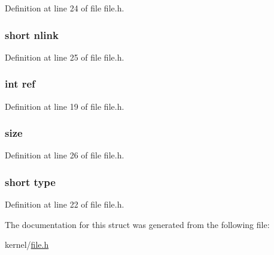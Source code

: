 Definition at line 24 of file file.\-h.

\hypertarget{structinode_aa7e1ed70907ed9a2fc9c9a7c24cd0d4d}{
\subsubsection[{nlink}]{\setlength{\rightskip}{0pt plus 5cm}short nlink}}\label{structinode_aa7e1ed70907ed9a2fc9c9a7c24cd0d4d}


Definition at line 25 of file file.\-h.

\hypertarget{structinode_adb528a1cb1ca190150183394d082590d}{
\subsubsection[{ref}]{\setlength{\rightskip}{0pt plus 5cm}int ref}}\label{structinode_adb528a1cb1ca190150183394d082590d}


Definition at line 19 of file file.\-h.

\hypertarget{structinode_a22d26304a3b3aca97e6311f6939dd1bf}{
\subsubsection[{size}]{ size}}\label{structinode_a22d26304a3b3aca97e6311f6939dd1bf}


Definition at line 26 of file file.\-h.

\hypertarget{structinode_acd579dfd50a9ea905ca697ed8707bf3b}{
\subsubsection[{type}]{\setlength{\rightskip}{0pt plus 5cm}short type}}\label{structinode_acd579dfd50a9ea905ca697ed8707bf3b}


Definition at line 22 of file file.\-h.



The documentation for this struct was generated from the following file\-:\begin{DoxyCompactItemize}
\item 
kernel/\hyperlink{file_8h}{file.\-h}\end{DoxyCompactItemize}
